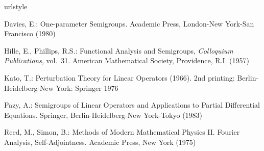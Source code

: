 \documentclass[%
,oneside]{book}
\theoremstyle{plain}
\theoremstyle{definition}
\theoremstyle{remark}
\begin{document}


\RaggedRight



% 


\begin{thebibliography}{99}
\providecommand{\url}[1]{{#1}}
\providecommand{\urlprefix}{URL }
\expandafter\ifx\csname urlstyle\endcsname\relax
  \providecommand{\doi}[1]{DOI~\discretionary{}{}{}#1}\else
  \providecommand{\doi}{DOI~\discretionary{}{}{}\begingroup
  \urlstyle{rm}\Url}\fi

Davies, E.: One-parameter Semigroups.
\newblock Academic Press, London-New York-San Francisco (1980)

Hille, E., Phillips, R.S.: Functional Analysis and Semigroups, \emph{Colloquium
  Publications}, vol.~31.
\newblock American Mathematical Society, Providence, R.I. (1957)

Kato, T.: Perturbation Theory for Linear Operators (1966).
\newblock 2nd printing: Berlin-Heidelberg-New York: Springer 1976

Pazy, A.: Semigroups of Linear Operators and Applications to Partial
  Differential Equations.
\newblock Springer, Berlin-Heidelberg-New York-Tokyo (1983)

Reed, M., Simon, B.: Methods of Modern Mathematical Physics {II}. {Fourier}
  Analysis, Self-Adjointness.
\newblock Academic Press, New York (1975)

\end{thebibliography}



\clearpage
\printindex

\end{document}
